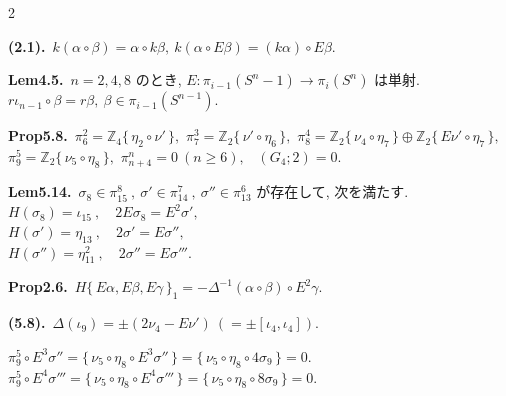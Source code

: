\documentclass[10pt, leqno]{ltjsarticle}
\newcommand{\todai}[2][]{\{\,#2\,\}_{#1}}      %
\newcommand{\gen}[1]{\{\,#1\,\}}       %
\newcommand{\pis}[2]{\pi_{#1}(#2)}       %
\newcommand{\pit}[2]{\pi_{#1}^{#2}}
\numberwithin{equation}{section}
\theoremstyle{plain}
\theoremstyle{definition}
\theoremstyle{remark}
\begin{document}
\begin{paracol}{2}
\switchcolumn

\noindent
\textbf{(2.1).}\
\(k(\alpha\circ\beta) = \alpha\circ k\beta,\
k(\alpha\circ E\beta) = (k\alpha)\circ E\beta.\)

\noindent
\textbf{Lem4.5.}\
\(n=2,4,8\) のとき, 
\(E:\pis{i-1}{S^n-1}\to\pis{i}{S^n}\) は単射.\\ 
\(r\iota_{n-1}\circ\beta = r\beta,\ \beta\in\pis{i-1}{S^{n-1}}\).

\noindent
\textbf{Prop5.8.}\
\(\pi^{2}_{6}=\mathbb Z_4\gen{\eta_{2}\circ\nu'},\) \quad
\(\pi^{3}_{7}=\mathbb Z_2\gen{\nu'\circ\eta_6},\) \quad
\(\pi^{4}_{8}=\mathbb Z_2\gen{\nu_{4}\circ\eta_7}\oplus \mathbb Z_2\gen{E\nu'\circ\eta_7},\) \\
\(\pi^{5}_{9}=\mathbb Z_2\gen{\nu_{5}\circ\eta_8},\) \quad
\(\pi^{n}_{n+4}=0\ (n\ge6),\) \
\((G_{4};2)=0.\)

\noindent
\textbf{Lem5.14.}\
\(\sigma_{8}\in\pi^{8}_{15}\ , \ \sigma'\in\pi^{7}_{14}\ , \ \sigma''\in\pi^{6}_{13}\) 
が存在して, 次を満たす. \\
\(H(\sigma_{8})=\iota_{15} \ ,\quad 2E\sigma_{8}=E^{2}\sigma',\)\\
\(H(\sigma')=\eta_{13} \ ,\quad 2\sigma'=E\sigma'',\)\\
\(H(\sigma'')=\eta_{11}^2 \ ,\quad 2\sigma''=E\sigma''' .\)

\noindent
\textbf{Prop2.6.}\
\(H\todai[1]{E\alpha, E\beta, E\gamma} 
= -\Delta^{-1}(\alpha\circ\beta)\circ E^2\gamma.\)

\noindent
\textbf{(5.8).}\
\(\Delta(\iota_9)=\pm(2\nu_4-E\nu')  \ (=\pm[\iota_4, \iota_4]) .\)

\noindent
\(\pit{9}{5}\circ E^3\sigma'' 
= \gen{\nu_5\circ\eta_8\circ E^3\sigma''}
= \gen{\nu_5\circ\eta_8\circ 4\sigma_9} = 0.\)\\
\(\pit{9}{5}\circ E^4\sigma''' 
= \gen{\nu_5\circ\eta_8\circ E^4\sigma'''}
= \gen{\nu_5\circ\eta_8\circ 8\sigma_9} = 0.\)




\end{paracol}
\end{document}
